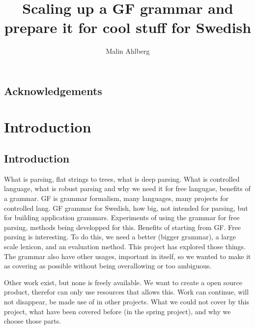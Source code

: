 \documentclass{report}
\begin{document}
\title{Scaling up a GF grammar and prepare it for cool stuff for Swedish}
\author{Malin Ahlberg}
\maketitle
\newpage

\tableofcontents
\newpage

\abstract{
}

\newpage

\section*{Acknowledgements}

\newpage
\chapter{Introduction}
\section{Introduction} 
What is parsing, flat strings to trees, what is deep parsing. What is controlled language,
what is robust parsing and why we need it for free langugae, benefits of a grammar.
GF is grammar formalism, many languages, many projects for controlled lang.
GF grammar for Swedish, how big, not intended for parsing, but for building
application grammars. Experiments of using the grammar for free parsing, methods
being developped for this. Benefits of starting from GF. Free parsing is
interesting. To do this, we need a better (bigger grammar), a large scale
lexicon, and an evaluation method. This project has explored those things. The
grammar also have other usages, important in itself, so we wanted to make it as
covering as possible without being overallowing or too ambiguous.

Other work exist, but none is freely available. We want to create a open source
product, therefor can only use resources that allows this. Work can continue,
will not disappear, be made use of in other projects.
What we could not cover by this project, what have been covered before (in
the spring project), and why we choose those parts.
\end{document}
